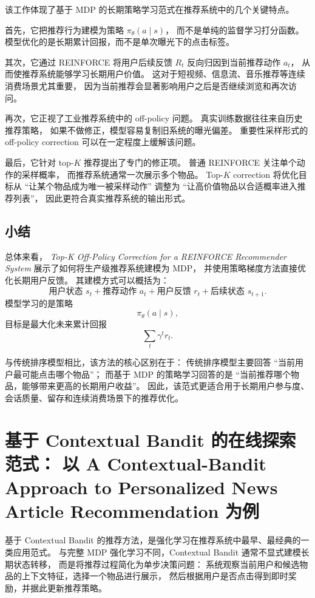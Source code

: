 \documentclass[11pt]{ctexart}
\begin{document}
该工作体现了基于 MDP 的长期策略学习范式在推荐系统中的几个关键特点。

首先，它把推荐行为建模为策略 $\pi_{\theta}(a\mid s)$，
而不是单纯的监督学习打分函数。
模型优化的是长期累计回报，而不是单次曝光下的点击标签。

其次，它通过 REINFORCE 将用户后续反馈 $R_t$ 反向归因到当前推荐动作 $a_t$，
从而使推荐系统能够学习长期用户价值。
这对于短视频、信息流、音乐推荐等连续消费场景尤其重要，
因为当前推荐会显著影响用户之后是否继续浏览和再次访问。

再次，它正视了工业推荐系统中的 off-policy 问题。
真实训练数据往往来自历史推荐策略，
如果不做修正，模型容易复制旧系统的曝光偏差。
重要性采样形式的 off-policy correction 可以在一定程度上缓解该问题。

最后，它针对 top-$K$ 推荐提出了专门的修正项。
普通 REINFORCE 关注单个动作的采样概率，
而推荐系统通常一次展示多个物品。
Top-$K$ correction 将优化目标从
``让某个物品成为唯一被采样动作''
调整为
``让高价值物品以合适概率进入推荐列表''，
因此更符合真实推荐系统的输出形式。

\subsection{小结}

总体来看，
\textit{Top-K Off-Policy Correction for a REINFORCE Recommender System}
展示了如何将生产级推荐系统建模为 MDP，
并使用策略梯度方法直接优化长期用户反馈。
其建模方式可以概括为：
\[
\text{用户状态 }s_t
+
\text{推荐动作 }a_t
+
\text{用户反馈 }r_t
+
\text{后续状态 }s_{t+1}.
\]
模型学习的是策略
\[
\pi_{\theta}(a\mid s),
\]
目标是最大化未来累计回报
\[
\sum_t \gamma^t r_t.
\]

与传统排序模型相比，该方法的核心区别在于：
传统排序模型主要回答
``当前用户最可能点击哪个物品''；
而基于 MDP 的策略学习回答的是
``当前推荐哪个物品，能够带来更高的长期用户收益''。
因此，该范式更适合用于长期用户参与度、会话质量、留存和连续消费场景下的推荐优化。

\section{基于 Contextual Bandit 的在线探索范式：
以 A Contextual-Bandit Approach to Personalized News Article Recommendation 为例}

基于 Contextual Bandit 的推荐方法，是强化学习在推荐系统中最早、最经典的一类应用范式。
与完整 MDP 强化学习不同，Contextual Bandit 通常不显式建模长期状态转移，
而是将推荐过程简化为单步决策问题：
系统观察当前用户和候选物品的上下文特征，选择一个物品进行展示，
然后根据用户是否点击得到即时奖励，并据此更新推荐策略。
\end{document}
